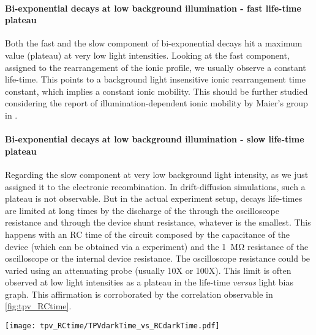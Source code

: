 	\paragraph{Bi-exponential decays at low background illumination - fast life-time plateau}
	Both the fast and the slow component of bi-exponential decays hit a maximum value (plateau) at very low light intensities.
	Looking at the fast component, assigned to the rearrangement of the ionic profile, we usually observe a constant life-time.
	This points to a background light insensitive ionic rearrangement time constant, which implies a constant ionic mobility.
	This should be further studied considering the report of illumination-dependent ionic mobility by Maier's group in .
		
	\paragraph{Bi-exponential decays at low background illumination - slow life-time plateau}
	Regarding the slow component at very low background light intensity, as we just assigned it to the electronic recombination.
	In drift-diffusion simulations, such a plateau is not observable.
	But in the actual experiment setup, decays life-times are limited at long times by the discharge of the through the oscilloscope resistance and through the device shunt resistance, whatever is the smallest.
	This happens with an RC time of the circuit composed by the capacitance of the device (which can be obtained via a  experiment) and the \SI{1}{\Mohm} resistance of the oscilloscope or the internal device resistance.
	The oscilloscope resistance could be varied using an attenuating probe (usually 10X or 100X).
	This limit is often observed at low light intensities as a plateau in the  life-time \textit{versus} light bias graph. 
	This affirmation is corroborated by the correlation observable in \cref{fig:tpv_RCtime}.
	
	\begin{SCfigure}
		\centering
		\texttt{[image: tpv\_RCtime/TPVdarkTime\_vs\_RCdarkTime.pdf]}
		\label{fig:tpv_RCtime}
	\end{SCfigure}
	
